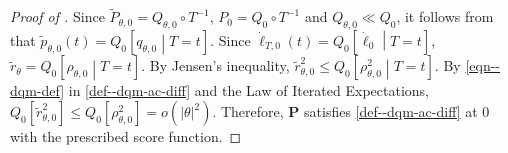 \begin{proof}[Proof of ]
Since \(\widetilde{P}_{\theta, 0} = Q_{\theta, 0} \circ T^{- 1}\), \(P_{0} =
Q_{0} \circ T^{- 1}\) and \(Q_{\theta, 0} \ll Q_{0}\), it follows from
 that \(\tilde{p}_{\theta, 0} (t) = Q_{0} \left[
q_{\theta, 0} \middle| T = t \right]\).
Since \(\dot{\ell}_{T, 0} (t) = Q_{0} \left[ \dot{\ell}_{0} \middle| T = t
\right]\), \(\tilde{r}_{\theta} = Q_{0} \left[ \rho_{\theta, 0} \middle| T = t
\right]\).
By Jensen's inequality, \(\tilde{r}_{\theta, 0}^{2} \leq Q_{0} \left[
\rho_{\theta, 0}^{2} \middle| T = t \right]\).
By \eqref{eqn--dqm-def} in  \ref{def--dqm-ac-diff} and the Law of
Iterated Expectations,
\(Q_{0} \left[ \tilde{r}_{\theta, 0}^{2} \right] \leq Q_{0} \left[
\rho_{\theta, 0}^{2} \right] = o \left( |\theta|^{2} \right)\).
Therefore, \(\mathbf{P}\) satisfies  \ref{def--dqm-ac-diff} at 0
with the prescribed score function.
\end{proof}

